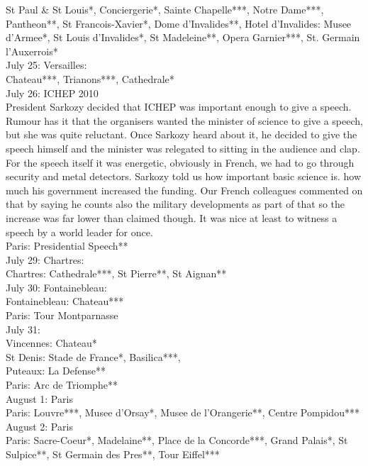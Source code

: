 St Paul \& St Louis*, Conciergerie*, Sainte Chapelle***, Notre Dame***, Pantheon**, St Francois-Xavier*, Dome d'Invalides**, Hotel d'Invalides: Musee d'Armee*, St Louis d'Invalides*, St Madeleine**, Opera Garnier***, St. Germain l'Auxerrois*\\

July 25: Versailles:\\
Chateau***, Trianons***, Cathedrale*\\

July 26: ICHEP 2010\\
President Sarkozy decided that ICHEP was important enough to give a speech. Rumour has it that the organisers wanted the minister of science to give a speech, but she was quite reluctant. Once Sarkozy heard about it, he decided to give the speech himself and the minister was relegated to sitting in the audience and clap. For the speech itself it was energetic, obviously in French, we had to go through security and metal detectors. Sarkozy told us how important basic science is. how much his government increased the funding. Our French colleagues commented on that by saying he counts also the military developments as part of that so the increase was far lower than claimed though. It was nice at least to witness a speech by a world leader for once.\\

Paris: Presidential Speech**\\

July 29: Chartres:\\
Chartres: Cathedrale***, St Pierre**, St Aignan**\\

July 30: Fontainebleau:\\
Fontainebleau: Chateau***\\
Paris: Tour Montparnasse\\

July 31: \\
Vincennes: Chateau*\\
St Denis: Stade de France*, Basilica***,\\
Puteaux: La Defense**\\
Paris: Arc de Triomphe**\\

August 1: Paris\\
Paris: Louvre***, Musee d'Orsay*, Musee de l'Orangerie**, Centre Pompidou***\\

August 2: Paris\\
Paris: Sacre-Coeur*, Madelaine**, Place de la Concorde***, Grand Palais*,  St Sulpice**, St Germain des Pres**, Tour Eiffel***\\


